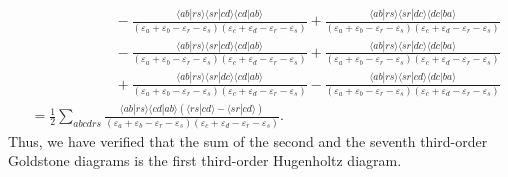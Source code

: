 \documentclass[a4paper]{book}
\newcounter{solution}[chapter]
\begin{document}
\begin{solution}
\begin{align*}
		&\hspace{6em} - \frac{ \langle ab | rs \rangle \langle sr | cd \rangle \langle cd | ab \rangle }{ ( \varepsilon_a + \varepsilon_b - \varepsilon_r - \varepsilon_s ) ( \varepsilon_c + \varepsilon_d - \varepsilon_r - \varepsilon_s ) } + \frac{ \langle ab | rs \rangle \langle sr | dc \rangle \langle dc | ba \rangle }{ ( \varepsilon_a + \varepsilon_b - \varepsilon_r - \varepsilon_s ) ( \varepsilon_c + \varepsilon_d - \varepsilon_r - \varepsilon_s ) } \\
		&\hspace{6em} - \frac{ \langle ab | rs \rangle \langle sr | cd \rangle \langle cd | ab \rangle }{ ( \varepsilon_a + \varepsilon_b - \varepsilon_r - \varepsilon_s ) ( \varepsilon_c + \varepsilon_d - \varepsilon_r - \varepsilon_s ) } + \frac{ \langle ab | rs \rangle \langle sr | dc \rangle \langle dc | ba \rangle }{ ( \varepsilon_a + \varepsilon_b - \varepsilon_r - \varepsilon_s ) ( \varepsilon_c + \varepsilon_d - \varepsilon_r - \varepsilon_s ) } \\
		&\hspace{6em} + \frac{ \langle ab | rs \rangle \langle sr | dc \rangle \langle cd | ab \rangle }{ ( \varepsilon_a + \varepsilon_b - \varepsilon_r - \varepsilon_s ) ( \varepsilon_c + \varepsilon_d - \varepsilon_r - \varepsilon_s ) } - \frac{ \langle ab | rs \rangle \langle sr | cd \rangle \langle dc | ba \rangle }{ ( \varepsilon_a + \varepsilon_b - \varepsilon_r - \varepsilon_s ) ( \varepsilon_c + \varepsilon_d - \varepsilon_r - \varepsilon_s ) } \\
		&= \frac{1}{2} \sum_{abcdrs} \frac{ \langle ab | rs \rangle \langle cd | ab \rangle \left( \langle rs | cd \rangle - \langle sr | cd \rangle \right) }{ ( \varepsilon_a + \varepsilon_b - \varepsilon_r - \varepsilon_s ) ( \varepsilon_c + \varepsilon_d - \varepsilon_r - \varepsilon_s ) }.
	\end{align*}
	Thus, we have verified that the sum of the second and the seventh third-order Goldstone diagrams is the first third-order Hugenholtz diagram.
	

\end{solution}
\end{document}
